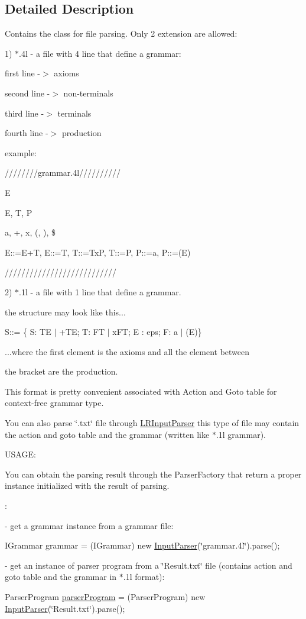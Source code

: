 \subsection{Detailed Description}
Contains the class for file parsing. Only 2 extension are allowed\-:\par
 1) $\ast$.4l -\/ a file with 4 line that define a grammar\-:\par
 first line -\/$>$ axioms\par
 second line -\/$>$ non-\/terminals\par
 third line -\/$>$ terminals\par
 fourth line -\/$>$ production\par
 example\-: \par
 ////////grammar.4l//////////\par
 E\par
 E, T, P\par
 a, +, x, (, ), \$\par
 E\-:\-:=E+\-T, E\-:\-:=T, T\-:\-:=Tx\-P, T\-:\-:=P, P\-:\-:=a, P\-:\-:=(E)\par
 ///////////////////////////\par


2) $\ast$.1l -\/ a file with 1 line that define a grammar.\par
 the structure may look like this...\par
 S\-:\-:= \{ S\-: T\-E $|$ +\-T\-E; T\-: F\-T $|$ x\-F\-T; E \-: eps; F\-: a $|$ (E)\}\par
 ...where the first element is the axioms and all the element between\par
 the bracket are the production.\par
 This format is pretty convenient associated with Action and Goto table for context-\/free grammar type.\par


You can also parse \char`\"{}.\-txt\char`\"{} file through \hyperlink{classinput_parser_1_1_l_r_input_parser}{L\-R\-Input\-Parser} this type of file may contain the action and goto table and the grammar (written like $\ast$.1l grammar).\par


U\-S\-A\-G\-E\-:\par
 You can obtain the parsing result through the Parser\-Factory that return a proper instance initialized with the result of parsing.\par
 \-: \par
-\/ get a grammar instance from a grammar file\-: \par
 I\-Grammar grammar = (I\-Grammar) new \hyperlink{classinput_parser_1_1_input_parser}{Input\-Parser}(\char`\"{}grammar.\-4l\char`\"{}).parse(); \par
 \par
-\/ get an instance of parser program from a \char`\"{}\-Result.\-txt\char`\"{} file (contains action and goto table and the grammar in $\ast$.1l format)\-: \par
 Parser\-Program \hyperlink{namespaceparser_program}{parser\-Program} = (Parser\-Program) new \hyperlink{classinput_parser_1_1_input_parser}{Input\-Parser}(\char`\"{}\-Result.\-txt\char`\"{}).parse(); 